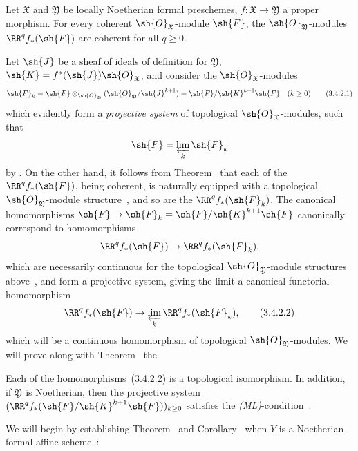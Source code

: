 \begin{theorem}[3.4.2]
\label{III.3.4.2}
Let $\mathfrak{X}$ and $\mathfrak{Y}$ be locally Noetherian formal preschemes, $f:\mathfrak{X}\to\mathfrak{Y}$ a proper morphism.
For every coherent $\sh{O}_\mathfrak{X}$-module $\sh{F}$, the $\sh{O}_\mathfrak{Y}$-modules $\RR^q f_*(\sh{F})$ are coherent for all $q\geq 0$.
\end{theorem}

Let $\sh{J}$ be a sheaf of ideals of definition for $\mathfrak{Y}$, $\sh{K}=f^*(\sh{J})\sh{O}_\mathfrak{X}$, and consider the $\sh{O}_\mathfrak{X}$-modules
\[
\label{III.3.4.2.1}
  \sh{F}_k=\sh{F}\otimes_{\sh{O}_\mathfrak{Y}}(\sh{O}_\mathfrak{Y}/\sh{J}^{k+1})=\sh{F}/\sh{K}^{k+1}\sh{F}\quad(k\geq 0)
  \tag{3.4.2.1}
\]
which evidently form a \emph{projective system} of topological $\sh{O}_\mathfrak{X}$-modules, such that
\[
  \sh{F}=\varprojlim_k\sh{F}_k
\]
by .
On the other hand, it follows from Theorem~ that each of the $\RR^q f_*(\sh{F})$, being coherent, is naturally equipped with a topological $\sh{O}_\mathfrak{Y}$-module structure~, and so are the $\RR^q f_*(\sh{F}_k)$.
The canonical homomorphisms $\sh{F}\to\sh{F}_k=\sh{F}/\sh{K}^{k+1}\sh{F}$ canonically correspond to homomorphisms
\[
  \RR^q f_*(\sh{F})\to\RR^q f_*(\sh{F}_k),
\]
which are necessarily continuous for the topological $\sh{O}_\mathfrak{Y}$-module structures above~, and form a projective system, giving the limit a canonical functorial homomorphism
\[
\label{III.3.4.2.2}
  \RR^q f_*(\sh{F})\to\varprojlim_k\RR^q f_*(\sh{F}_k),
  \tag{3.4.2.2}
\]
which will be a continuous homomorphism of topological $\sh{O}_\mathfrak{Y}$-modules.
We will prove along with Theorem~ the
\begin{corollary}[3.4.3]
\label{III.3.4.3}
Each of the homomorphisms~(\hyperref[III.3.4.2.2]{3.4.2.2}) is a topological isomorphism.
In addition, if $\mathfrak{Y}$ is Noetherian, then the projective system $(\RR^q f_*(\sh{F}/\sh{K}^{k+1}\sh{F}))_{k\geq 0}$ satisfies the \emph{(ML)}-condition~.
\end{corollary}
We will begin by establishing Theorem~ and Corollary~ when $Y$ is a Noetherian formal affine scheme~:
